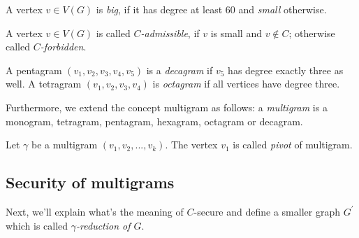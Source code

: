 \begin{definition}
A vertex $v \in V(G)$ is \textit{big}, if it has degree at least 60 and \textit{small} otherwise.  
\end{definition}

\begin{definition}
A vertex $v \in V(G)$ is called \textit{$C$-admissible}, if $v$ is small and $v \notin C$; otherwise called \textit{$C$-forbidden}. 
\end{definition}

\begin{definition}
A pentagram $(v_1, v_2, v_3, v_4, v_5)$ is a \textit{decagram} if $v_5$ has degree exactly three as well. A tetragram $(v_1, v_2, v_3, v_4)$ is \textit{octagram} if all vertices have degree three. 
\end{definition}
Furthermore, we extend the concept multigram as follows: a \textit{multigram} is a monogram, tetragram, pentagram, hexagram, octagram or decagram.

\begin{definition}
Let $\gamma$ be a multigram $(v_1, v_2, ..., v_k)$. The vertex $v_1$ is called \textit{pivot} of multigram.
\end{definition}
\subsection{Security of multigrams}
Next, we'll explain what's the meaning of $C$-secure and define a smaller graph $G^{'}$ which is called \textit{$\gamma$-reduction of $G$}.

